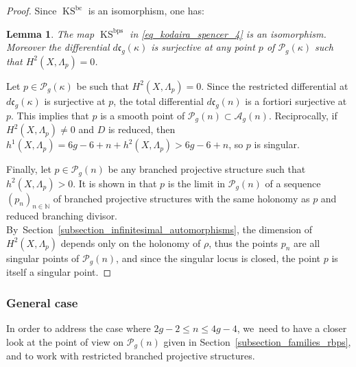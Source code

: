 \documentclass[JEP,XML,SOM,Unicode,NoEqCountersInSection,published]{cedram}
\newcommand{\N}{\mathbb N}
\newcommand{\BC}{\mathrm{bc}}
\newcommand{\BPS}{\mathrm{bps}}
\DeclareMathOperator{\KS}{KS}
\theoremstyle{definition}
\theoremstyle{plain}
\newtheorem{lemma}[definition]{Lemma}
\begin{document}
\begin{proof}
Since $\KS^{\BC}$ is an isomorphism, one has:

\begin{lemma}
The map $\KS^{\BPS}$ in \eqref{eq_kodaira_spencer_4} is an isomorphism.
Moreover the differential $d\mathfrak c_g(\kappa)$ is surjective at any point $p$ of $\mathcal P_g(\kappa)$ such that $H^2\left(X, \Lambda_p\right)=0$.
\end{lemma}

Let $p \in \mathcal P_g(\kappa)$ be such that $H^2\left(X, \Lambda_p\right) = 0$.
Since the restricted differential at $d\mathfrak c_g(\kappa)$ is surjective at $p$, the total differential $d\mathfrak c_g(n)$ is a fortiori surjective at $p$.
This implies that $p$ is a smooth point of $\mathcal P_g(n) \subset \mathcal A_g(n)$.
Reciprocally, if $H^2\left(X, \Lambda_p\right) \neq 0$ and $D$ is reduced, then $h^1\left(X, \Lambda_p\right) = 6g-6+n+h^2\left(X, \Lambda_p\right) > 6g-6+n$, so $p$ is singular.

Finally, let $p \in \mathcal P_g(n)$ be any branched projective structure such that \hbox{$h^2(X, \Lambda_p) > 0$}.
It is shown in \cite{calsamiglia-deroin-francaviglia} that $p$ is the limit in $\mathcal P_g(n)$ of a sequence $\left(p_n\right)_{n \in \N}$ of branched projective structures with the same holonomy as $p$ and reduced branching divisor.
By~Section~\ref{subsection_infinitesimal_automorphisms}, the dimension of $H^2\left(X, \Lambda_p\right)$ depends only on the holonomy of $\rho$, thus the points $p_n$ are all singular points of $\mathcal P_g(n)$, and since the singular locus is closed, the point $p$ is itself a singular point.
\end{proof}

\subsubsection{General case}\label{subsubsection_singular_points_general_case}

In order to address the case where $2g-2 \le n \le 4g-4$, we~need to have a closer look at the point of view on $\mathcal P_g(n)$ given in Section~\ref{subsection_families_rbps}, and to work with restricted branched projective structures.
\end{document}
